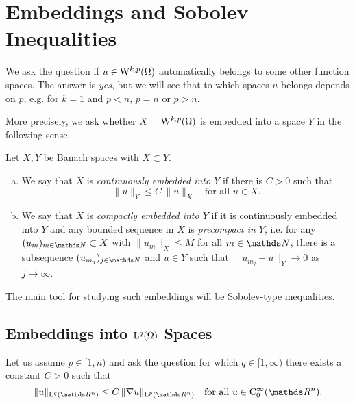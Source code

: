 \chapter{Embeddings and Sobolev Inequalities}

We ask the question if $u \in \mathrm{W}^{k,p}(\Omega)$ automatically belongs to some other function spaces.
The answer is \emph{yes}, but we will see that to which spaces $u$ belongs depends on $p$, e.g. for $k = 1$ and $p < n$, $p = n$ or $p > n$.

More precisely, we ask whether $X = \mathrm{W}^{k,p}(\Omega)$ is embedded into a space $Y$ in the following sense.

\begin{defn}
  \label{defn:embedding}
  Let $X, Y$ be Banach spaces with $X \subset Y$.
  \begin{enumerate}[a)]
    \item We say that $X$ is \emph{continuously embedded into $Y$} if there is $C > 0$ such that
      $$
      \|u\|_Y \leq C \, \|u\|_X \quad\text{for all } u \in X.
      $$
    \item We say that $X$ is \emph{compactly embedded into $Y$} if it is continuously embedded into $Y$ and any bounded sequence in $X$ is \emph{precompact in $Y$}, i.e. for any $(u_m)_{m \in \N} \subset X$ with $\|u_m\|_X \leq M$ for all $m \in \N$, there is a subsequence $(u_{m_j})_{j \in \N}$ and $u \in Y$ such that $\|u_{m_j} - u\|_Y \to 0$ as $j \to \infty$.
  \end{enumerate}
\end{defn}

The main tool for studying such embeddings will be Sobolev-type inequalities.

\section{Embeddings into \texorpdfstring{$\mathrm{L}^q(\Omega)$}{L\textasciicircum q(Omega)} Spaces}
\label{sec:lpEmbedding}

Let us assume $p \in [1,n)$ and ask the question for which $q \in [1,\infty)$ there exists a constant $C > 0$ such that
\begin{equation}
  \label{eq:sobolevTypeIneq}
  \|u\|_{\Ell^q(\R^n)} \leq C \, \|\nabla u\|_{\Ell^p(\R^n)} \quad\text{for all } u \in \CC_0^\infty(\R^n). 
\end{equation}

